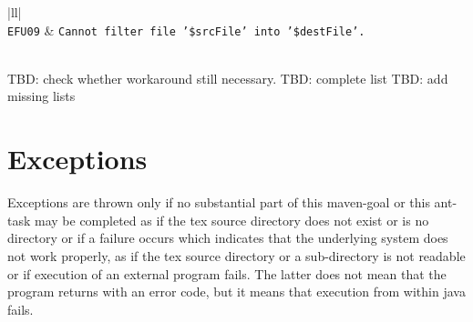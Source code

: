 \documentclass[12pt]{book}
\begin{document}
\begin{longtable}{|ll|}
 \\
\texttt{\footnotesize EFU09}  & \texttt{\footnotesize Cannot filter file '\$srcFile' into '\$destFile'. } \\
 \\
\end{longtable}
TBD: check whether workaround still necessary. 
TBD: complete list
TBD: add missing lists 


\section{Exceptions}\label{sec:exception}

Exceptions are thrown only if no substantial part of 
this maven-goal or this ant-task may be completed 
as if the tex source directory does not exist or is no directory 
or if a failure occurs which indicates 
that the underlying system does not work properly, 
as if the tex source directory or a sub-directory is not readable 
or if execution of an external program fails. 
The latter does not mean that the program returns with an error code, 
but it means that execution from within java fails.
\end{document}
